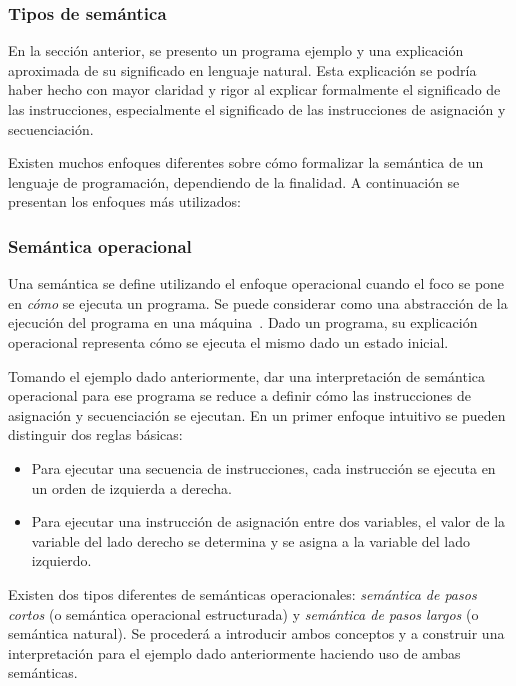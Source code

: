 \subsubsection*{Tipos de semántica}

En la sección anterior, se presento un programa ejemplo y una explicación aproximada de su significado en lenguaje natural.
Esta explicación se podría haber hecho con mayor claridad y rigor al explicar formalmente el significado de las instrucciones, especialmente el significado de las instrucciones de asignación y secuenciación.

Existen muchos enfoques diferentes sobre cómo formalizar la semántica de un lenguaje de programación, dependiendo de la finalidad.
A continuación se presentan los enfoques más utilizados:


\subsubsection*{Semántica operacional}

Una semántica se define utilizando el enfoque operacional cuando el foco se pone en \textit{cómo} se ejecuta un programa.
Se puede considerar como una abstracción de la ejecución del programa en una máquina~\citep{nielson}.
Dado un programa, su explicación operacional representa cómo se ejecuta el mismo dado un estado inicial.

Tomando el ejemplo dado anteriormente, dar una interpretación de semántica operacional para ese programa se reduce a definir cómo las instrucciones de asignación y secuenciación se ejecutan.
En un primer enfoque intuitivo se pueden distinguir dos reglas básicas:

\begin{itemize}
\item{Para ejecutar una secuencia de instrucciones, cada instrucción se ejecuta en un orden de izquierda a derecha.}
\item{Para ejecutar una instrucción de asignación entre dos variables, el valor de la variable del lado derecho se determina y se asigna a la variable del lado izquierdo.}
\end{itemize}

Existen dos tipos diferentes de semánticas operacionales: \textit{semántica de pasos cortos} (o semántica operacional estructurada) y \textit{semántica de pasos largos} (o semántica natural).
Se procederá a introducir ambos conceptos y a construir una interpretación para el ejemplo dado anteriormente haciendo uso de ambas semánticas.


